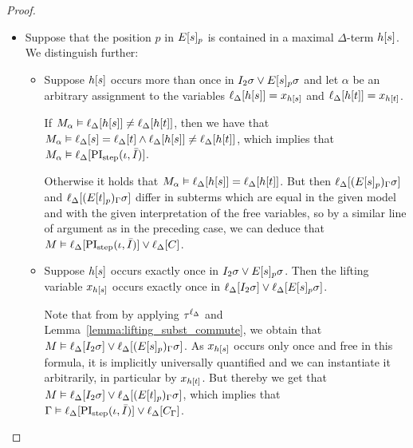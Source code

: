 \begin{proof}
\begin{description}
\begin{itemize}
				\item
					Suppose that the position $p$ in $E{[s]_{p}}$ is contained in a maximal $\Delta$-term $h[s]$.
					We distinguish further:

					\begin{itemize}
						\item Suppose $h[s]$ occurs more than once in $I_2\sigma \lor E{[s]_{p}}\sigma$ and let $\alpha$ be an arbitrary assignment to the variables $\ell_{\Delta}[h[s]] = x_{h[s]}$ and $\ell_{\Delta}[h[t]] = x_{h[t]}$.

							If $M_\alpha \vDash \ell_{\Delta}[h[s]] \neq \ell_{\Delta}[h[t]]$, then we have that $M_\alpha \entails \lifdeltanovar{s}\nolinebreak=\lifdeltanovar{t} \land\allowbreak \lifdeltanovar{h\occ{s}} \neq \lifdeltanovar{h\occ{t}}$, which implies that $M_\alpha \vDash \ell_{\Delta}[\operatorname{PI}_{\mathrm{step}}(\iota, \bar I)]$.

							Otherwise it holds that $M_\alpha \vDash \ell_{\Delta}[h[s]] = \ell_{\Delta}[h[t]]$.
							But then 
							$\ell_{\Delta}[(E{[s]_{p}})_\Gamma\sigma]$
							and
							$\ell_{\Delta}[(E{[t]_{p}})_\Gamma\sigma]$
							differ in subterms which are equal in the given model and with the given interpretation of the free variables,
							so by a similar line of argument as in the preceding case, we can deduce that $M \vDash \ell_{\Delta}[\operatorname{PI}_{\mathrm{step}}(\iota, \bar I)] \lor \ell_{\Delta}[C]$.

						\item Suppose $h[s]$ occurs exactly once in $I_2\sigma \lor E{[s]_{p}}\sigma$.
							Then the lifting variable $x_{h[s]}$
							occurs exactly once in $\ell_{\Delta}[I_2\sigma] \lor \ell_{\Delta}[E{[s]_{p}}\sigma]$.

							Note that from \markB{} by applying $\tau^{\ell_\Delta}$ and Lemma~\ref{lemma:lifting_subst_commute}, we obtain that $M\vDash \ell_{\Delta}[I_2\sigma] \lor \ell_{\Delta}[(E{[s]_{p}})_\Gamma\sigma]$.
							As $x_{h[s]}$ occurs only once and free in this formula, it is implicitly universally quantified and we can instantiate it arbitrarily, in particular by $x_{h[t]}$.
							But thereby we get that 
							$M\vDash \ell_{\Delta}[I_2\sigma] \lor \ell_{\Delta}[(E{[t]_{p}})_\Gamma\sigma]$, 
							which implies that
							$\Gamma\vDash \ell_{\Delta}[\operatorname{PI}_{\mathrm{step}}(\iota, \bar I)] \lor \ell_{\Delta}[C_\Gamma]$.
							\qedhere
					\end{itemize}
			\end{itemize}

	\end{description}
\end{proof}

